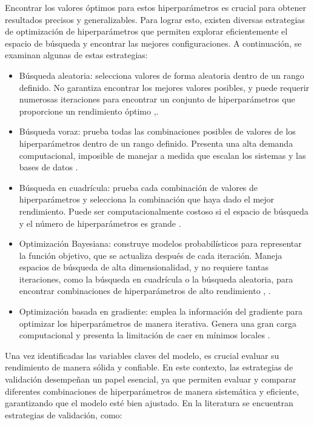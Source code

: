 Encontrar los valores óptimos para estos hiperparámetros es crucial para obtener resultados precisos y generalizables. Para lograr esto, existen diversas estrategias de optimización de hiperparámetros que permiten explorar eficientemente el espacio de búsqueda y encontrar las mejores configuraciones. A continuación, se examinan algunas de estas estrategias:

\begin{itemize}
	\item Búsqueda aleatoria: selecciona valores de forma aleatoria dentro de un rango definido. No garantiza encontrar los mejores valores posibles, y puede requerir numerosas iteraciones para encontrar un conjunto de hiperparámetros que proporcione un rendimiento óptimo \citep{geron2022hands},\citep{zoller2021benchmark}.
	\item Búsqueda voraz: prueba todas las combinaciones posibles de valores de los hiperparámetros dentro de un rango definido. Presenta una alta demanda computacional, imposible de manejar a medida que escalan los sistemas y las bases de datos \citep{zoller2021benchmark}.
	\item Búsqueda en cuadrícula: prueba cada combinación de valores de hiperparámetros y selecciona la combinación que haya dado el mejor rendimiento. Puede ser computacionalmente costoso si el espacio de búsqueda y el número de hiperparámetros es grande \citep{he2021automl}.
	\item Optimización Bayesiana: construye modelos probabilísticos para representar la función objetivo, que se actualiza después de cada iteración. Maneja espacios de búsqueda de alta dimensionalidad, y no requiere tantas iteraciones, como la búsqueda en cuadrícula o la búsqueda aleatoria, para encontrar combinaciones de hiperparámetros de alto rendimiento \citep{hutter2019automated}, \citep{he2021automl}.
	\item Optimización basada en gradiente: emplea la información del gradiente para optimizar los hiperparámetros de manera iterativa. Genera una gran carga computacional y presenta la limitación de caer en mínimos locales \citep{zoller2021benchmark}.
\end{itemize} 

Una vez identificadas las variables claves del modelo, es crucial evaluar su rendimiento de manera sólida y confiable. En este contexto, las estrategias de validación desempeñan un papel esencial, ya que permiten evaluar y comparar diferentes combinaciones de hiperparámetros de manera sistemática y eficiente, garantizando que el modelo esté bien ajustado. En la literatura se encuentran estrategias de validación, como:

